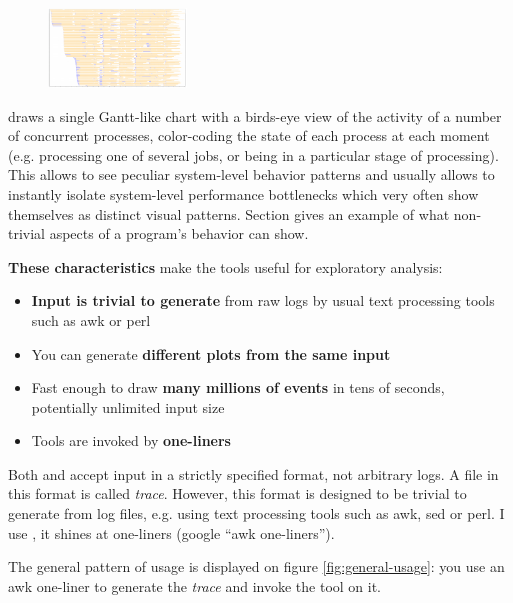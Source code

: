 \documentclass{article}
\begin{document}
\begin{figure}
\vspace{-5pt}
\center
\includegraphics[height=60pt]{pics/splot/splot-main-example.png}
\end{figure}
\splot{} draws a single Gantt-like chart with a birds-eye view of the activity of a number of concurrent processes, color-coding the state of each process at each moment (e.g. processing one of several jobs, or being in a particular stage of processing). This allows to see peculiar system-level behavior patterns and usually allows to instantly isolate system-level performance bottlenecks which very often show themselves as distinct visual patterns. Section  gives an example of what non-trivial aspects of a program's behavior \splot{} can show.

\textbf{These characteristics} make the tools useful for exploratory analysis:

\begin{itemize}
\item \textbf{Input is trivial to generate} from raw logs by usual text processing tools such as awk or perl
\item You can generate \textbf{different plots from the same input}
\item Fast enough to draw \textbf{many millions of events} in tens of seconds, potentially unlimited input size
\item Tools are invoked by \textbf{one-liners}
\end{itemize} 

Both \timeplot{} and \splot{} accept input in a strictly specified format, not arbitrary logs. A file in this format is called \emph{trace}. However, this format is designed to be trivial to generate from log files, e.g. using text processing tools such as awk, sed or perl. I use \awk{}, it shines at one-liners (google ``awk one-liners'').

The general pattern of usage is displayed on figure \ref{fig:general-usage}: you use an awk one-liner to generate the \emph{trace} and invoke the tool on it.
\end{document}
